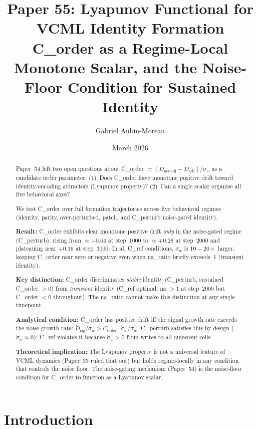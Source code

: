 \documentclass[11pt,a4paper]{article}
\title{\textbf{Paper 55: Lyapunov Functional for VCML Identity Formation}\\
\large C\_order as a Regime-Local Monotone Scalar, and the
Noise-Floor Condition for Sustained Identity}
\author[1]{Gabriel Aubin-Moreau}
\affil[1]{Independent research}
\date{March 2026}
\begin{document}
\maketitle

\begin{abstract}
Paper~54 left two open questions about C\_order $= (D_\mathrm{nonadj} - D_\mathrm{adj})/\sigma_w$
as a candidate order parameter: (1)~Does C\_order have monotone positive drift toward
identity-encoding attractors (Lyapunov property)?
(2)~Can a single scalar organise all five behavioral axes?

We test C\_order over full formation trajectories across five behavioral regimes
(identity, parity, over-perturbed, patch, and C\_perturb noise-gated identity).

\textbf{Result:}
C\_order exhibits clear monotone positive drift
\emph{only} in the noise-gated regime (C\_perturb), rising from $\approx{-0.04}$ at
step~1000 to $\approx{+0.28}$ at step~2000 and plateauing near $+0.16$ at step~3000.
In all C\_ref conditions, $\sigma_w$ is $10{-}20\times$ larger, keeping C\_order near zero
or negative even when na\_ratio briefly exceeds~1 (transient identity).

\textbf{Key distinction:}
C\_order discriminates \emph{stable} identity (C\_perturb, sustained C\_order $>0$)
from \emph{transient} identity (C\_ref optimal, na $>1$ at step~2000 but
C\_order $< 0$ throughout).
The na\_ratio cannot make this distinction at any single timepoint.

\textbf{Analytical condition:}
C\_order has positive drift iff the signal growth rate exceeds the
noise growth rate: $\dot{D}_\mathrm{sig}/\sigma_w > C_\mathrm{order} \cdot \dot{\sigma}_w/\sigma_w$.
C\_perturb satisfies this by design ($\dot{\sigma}_w \approx 0$);
C\_ref violates it because $\dot{\sigma}_w > 0$ from writes to all quiescent cells.

\textbf{Theoretical implication:}
The Lyapunov property is not a universal feature of VCML dynamics (Paper~33 ruled
that out) but holds regime-locally in any condition that controls the noise floor.
The noise-gating mechanism (Paper~54) is the noise-floor condition for C\_order
to function as a Lyapunov scalar.
\end{abstract}

\section{Introduction}
\end{document}
